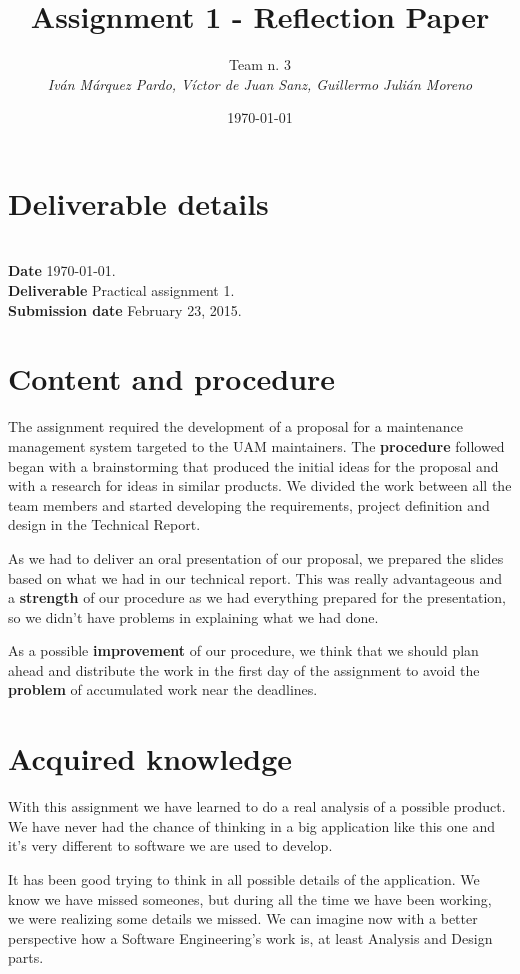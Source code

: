 \documentclass{article}
\title{Assignment 1 - Reflection Paper}
\date{\today}
\author{Team n. 3 \\ \vspace{5pt} \textit{Iván Márquez Pardo, Víctor de Juan Sanz, Guillermo Julián Moreno}}
\newcommand{\header}[1]{\\ \indent \textbf{#1}\hspace{10pt}}
\begin{document}
\maketitle
\pagestyle{plain}

\section{Deliverable details}

\noindent
\header{Date} \today.
\header{Deliverable} Practical assignment 1.
\header{Submission date} February 23, 2015.

\section{Content and procedure}

The assignment required the development of a proposal for a maintenance management system targeted to the UAM maintainers. The \textbf{procedure} followed began with a brainstorming that produced the initial ideas for the proposal and with a research for ideas in similar products. We divided the work between all the team members and started developing the requirements, project definition and design in the Technical Report.

As we had to deliver an oral presentation of our proposal, we prepared the slides based on what we had in our technical report. This was really advantageous and a \textbf{strength} of our procedure as we had everything prepared for the presentation, so we didn't have problems in explaining what we had done.

As a possible \textbf{improvement} of our procedure, we think that we should plan ahead and distribute the work in the first day of the assignment to avoid the \textbf{problem} of accumulated work near the deadlines.

\section{Acquired knowledge}

With this assignment we have learned to do a real analysis of a possible product. We have never had the chance of thinking in a big application like this one and it's very different to software we are used to develop.

It has been good trying to think in all possible details of the application. We know we have missed someones, but during all the time we have been working, we were realizing some details we missed. We can imagine now with a better perspective how a Software Engineering's work is, at least Analysis and Design parts.
\end{document}
